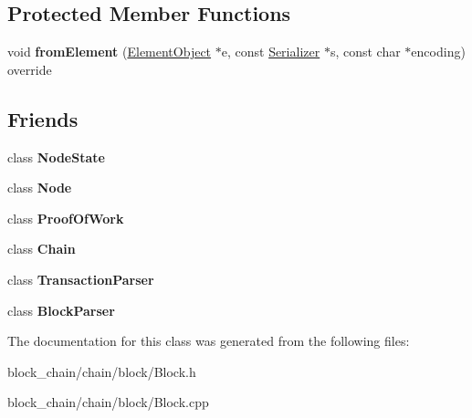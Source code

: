 \subsection*{Protected Member Functions}
\begin{DoxyCompactItemize}
\item 
\mbox{\label{classBlock_ab21c6536cf7a26fdf2a2e889a84fcb9d}} 
void {\bfseries from\+Element} (\mbox{\hyperlink{classElementObject}{Element\+Object}} $\ast$e, const \mbox{\hyperlink{classSerializer}{Serializer}} $\ast$s, const char $\ast$encoding) override
\end{DoxyCompactItemize}
\subsection*{Friends}
\begin{DoxyCompactItemize}
\item 
\mbox{\label{classBlock_adfdd1242f00ef4da9a9a01d996fc292c}} 
class {\bfseries Node\+State}
\item 
\mbox{\label{classBlock_a6db9d28bd448a131448276ee03de1e6d}} 
class {\bfseries Node}
\item 
\mbox{\label{classBlock_a5493b64dfe8bc707452f326c6ec29f14}} 
class {\bfseries Proof\+Of\+Work}
\item 
\mbox{\label{classBlock_a65813570c30a3e0656fa523793ff1b86}} 
class {\bfseries Chain}
\item 
\mbox{\label{classBlock_a760b1478b5214c122458f0f19d45c127}} 
class {\bfseries Transaction\+Parser}
\item 
\mbox{\label{classBlock_a8428b3aeea6607d1ba12e603ff9d015c}} 
class {\bfseries Block\+Parser}
\end{DoxyCompactItemize}


The documentation for this class was generated from the following files\+:\begin{DoxyCompactItemize}
\item 
block\+\_\+chain/chain/block/Block.\+h\item 
block\+\_\+chain/chain/block/Block.\+cpp\end{DoxyCompactItemize}
